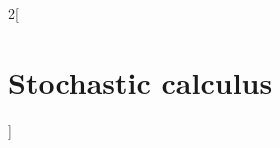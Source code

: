 \documentclass[../../../main_math.tex]{subfiles}
\begin{document}
\begin{multicols}{2}[\section{Stochastic calculus}]

\end{multicols}
\end{document}
